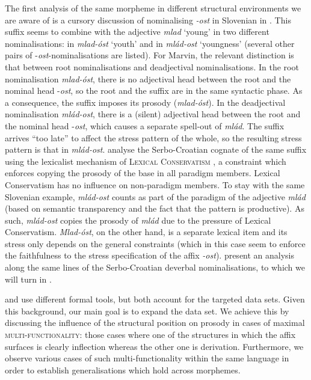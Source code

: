 \documentclass[output=paper]{langsci/langscibook}
\begin{document}
The first analysis of the same morpheme in different structural environments we are aware of is a cursory discussion of nominalising \textit{-ost} in Slovenian in \citet{Mar2002}. This suffix seems to combine with the adjective \textit{mlad} `young' in two different nominalisations: in \textit{mlad-óst} `youth' and in \textit{mlád-ost} `youngness' (several other pairs of -\textit{ost}-nominalisations are listed). For Marvin, the relevant distinction is that between root nominalisations and deadjectival nominalisations. In the root nominalisation \textit{mlad-}\textit{óst}, there is no adjectival head between the root and the nominal head -\textit{ost}, so the root and the suffix are in the same syntactic phase. As a consequence, the suffix imposes its prosody (\textit{mlad-óst}). In the deadjectival nominalisation \textit{mlád-ost}, there is a (silent) adjectival head between the root and the nominal head -\textit{ost}, which causes a separate spell-out of \textit{mlád}. The suffix arrives “too late” to affect the stress pattern of the whole, so the resulting stress pattern is that in \textit{mlád-}\textit{ost}. \citet{Arsim2013} analyse the Serbo-Croatian cognate of the same suffix using the lexicalist mechanism of \textsc{Lexical Conservatism} \citep[first proposed in][]{Ste1997}, a constraint which enforces copying the prosody of the base in all paradigm members. Lexical Conservatism has no influence on non-paradigm members. To stay with the same Slovenian example, \textit{mlád-}\textit{ost} counts as part of the paradigm of  the adjective \textit{mlád} (based on semantic transparency and the fact that the pattern is productive). As such, \textit{mlád-}\textit{ost} copies the prosody of \textit{mlád} due to the pressure of Lexical Conservatism. \textit{Mlad-}\textit{óst}, on the other hand, is a separate lexical item and its stress only depends on the general constraints (which in this case seem to enforce the faithfulness to the stress specification of the affix \textit{-ost}). \citet{Sim2014} present an analysis along the same lines of the Serbo-Croatian deverbal nominalisations, to which we will turn in . 

\citet{Mar2002} and \citet{Arsim2013} use different formal tools, but both account for the targeted data sets. Given this background, our main goal is to expand the data set. We achieve this by discussing the influence of the structural position on prosody in cases of maximal \textsc{multi-functionality}: those cases where one of the structures in which the affix surfaces is clearly inflection whereas the other one is derivation. Furthermore, we observe various cases of such multi-functionality within the same language in order to establish generalisations which hold across morphemes. 
\end{document}
